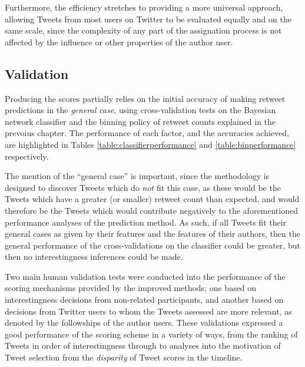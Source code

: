 Furthermore, the efficiency stretches to providing a more universal approach, allowing Tweets from most users on Twitter to be evaluated equally and on the same scale, since the complexity of any part of the assignation process is not affected by the influence or other properties of the author user. 


\subsection{Validation}
Producing the scores partially relies on the initial accuracy of making retweet predictions in the \textit{general case}, using cross-validation tests on the Bayesian network classifier and the binning policy of retweet counts explained in the prevoius chapter. The performance of each factor, and the accuracies achieved, are highlighted in Tables \ref{table:classifierperformance} and \ref{table:binperformance} respectively.

The mention of the ``general case'' is important, since the methodology is designed to discover Tweets which do \textit{not} fit this case, as these would be the Tweets which have a greater (or smaller) retweet count than expected, and would therefore be the Tweets which would contribute negatively to the aforementioned performance analyses of the prediction method. As such, if all Tweets fit their general cases as given by their features and the features of their authors, then the general performance of the cross-validations on the classifier could be greater, but then no interestingness inferences could be made.

Two main human validation tests were conducted into the performance of the scoring mechanisms provided by the improved methods; one based on interestingness decisions from non-related participants, and another based on decisions from Twitter users to whom the Tweets assessed are more relevant, as denoted by the followships of the author users. These validations expressed a good performance of the scoring scheme in a variety of ways, from the ranking of Tweets in order of interestingness through to analyses into the motivation of Tweet selection from the \textit{disparity} of Tweet scores in the timeline.


